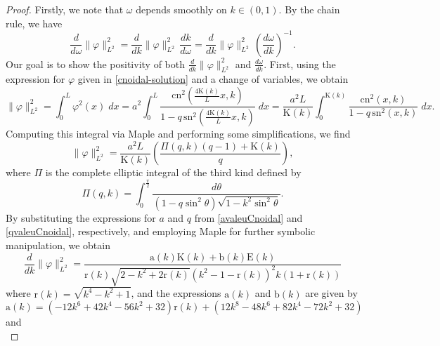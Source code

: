 \documentclass[10pt,reqno,a4paper]{amsart} %
\theoremstyle{definition} %
\numberwithin{equation}{section}
\numberwithin{figure}{section}
\begin{document}
\begin{proof}
    Firstly, we note that $\omega$ depends smoothly on $k \in (0,1)$. By the chain rule, we have
    \begin{equation*}
        \frac{d}{d\omega} \|\varphi\|_{L^2}^2 = \frac{d}{dk} \|\varphi\|_{L^2}^2 \, \frac{dk}{d\omega} = \frac{d}{dk} \|\varphi\|_{L^2}^2 \, \left( \frac{d\omega}{dk}\right)^{-1}.
    \end{equation*}
    Our goal is to show the positivity of both $\frac{d}{dk} \|\varphi\|_{L^2}^2$ and $\frac{d\omega}{dk}$. First, using the expression for $\varphi$ given in \eqref{cnoidal-solution} and a change of variables, we obtain
    \begin{equation*}
        \|\varphi\|_{L^2}^2 = \int_0^L \varphi^2(x)\; dx = a^2 \int_0^L \frac{ \text{cn}^2 \left( \frac{4 \text{K}(k)}{L} x, k \right)}{ 1 - q \, \text{sn}^2 \left( \frac{4 \text{K}(k)}{L} x, k \right)} \; dx = \frac{a^2 L}{\text{K}(k)} \int_0^{\text{K}(k)} \frac{ \text{cn}^2(x,k)}{1-q \, \text{sn}^2(x,k)} \;dx.
    \end{equation*}
    Computing this integral via Maple and performing some simplifications, we find
    \begin{equation*}
        \|\varphi\|_{L^2}^2 = \frac{a^2 L}{\text{K}(k)} \left( \frac{\Pi(q,k) (q-1) + \text{K}(k)}{q} \right),
    \end{equation*}
    where $\Pi$ is the complete elliptic integral of the third kind defined by 
    \begin{equation*}
    \Pi(q, k) = \int_{0}^{\frac{\pi}{2}} \frac{d\theta}{(1 - q \sin^2 \theta) \sqrt{1 - k^2 \sin^2 \theta}}.
    \end{equation*}
    By substituting the expressions for $a$ and $q$ from \eqref{avaleuCnoidal} and \eqref{qvaleuCnoidal}, respectively, and employing Maple for further symbolic manipulation, we obtain
    \begin{equation}\label{ddkphi}
        \frac{d}{dk} \|\varphi\|_{L^2}^2 = \frac{\text{a}(k) \text{K}(k) + \text{b}(k) \text{E}(k)}{\text{r}(k) \sqrt{2-k^2+2\text{r}(k)} (k^2 - 1 - \text{r}(k))^2 k (1+\text{r}(k))}
    \end{equation}
    where $\text{r}(k) = \sqrt{k^4 - k^2 + 1}$, and the expressions $\text{a}(k)$ and $\text{b}(k)$ are given by
    \begin{equation*}
        \text{a}(k) = (-12k^6 + 42k^4 - 56k^2 + 32) \text{r}(k) + (12k^8 - 48k^6 + 82k^4 - 72k^2 + 32)
    \end{equation*}
    and
    \begin{equation*}

\end{equation*}
\end{proof}
\end{document}
